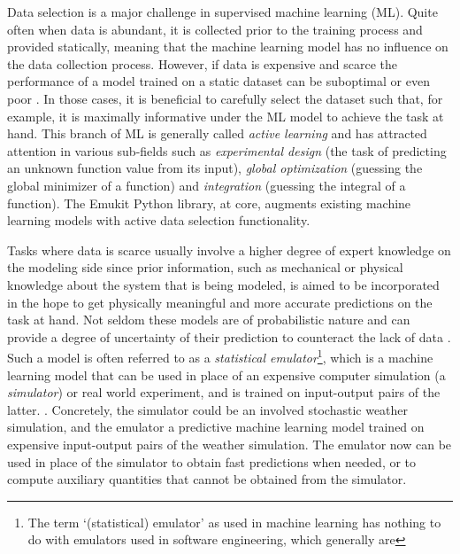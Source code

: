 Data selection is a major challenge in supervised machine learning (ML). Quite often when data is abundant, it is collected prior to the training process and provided statically, meaning that the machine learning model has no influence on the data collection process. However, if data is expensive and scarce the performance of a model trained on a static dataset can be suboptimal or even poor . In those cases, it is beneficial to carefully select the dataset such that, for example, it is maximally informative under the ML model to achieve the task at hand. This branch of ML is generally called \emph{active learning}  and has attracted attention in various sub-fields such as \emph{experimental design} (the task of predicting an unknown function value from its input), \emph{global optimization} (guessing the global minimizer of a function) and \emph{integration} (guessing the integral of a function).
The Emukit Python library, at core, augments existing machine learning models with active data selection functionality.

Tasks where data is scarce usually involve a higher degree of expert knowledge on the modeling side since prior information, such as mechanical or physical knowledge about the system that is being modeled, is aimed to be incorporated in the hope to get physically meaningful and more accurate predictions on the task at hand. Not seldom these models are of probabilistic nature and can provide a degree of uncertainty of their prediction to counteract the lack of data . Such a model is often referred to as a \emph{statistical emulator}\footnote{The term `(statistical) emulator' as used in machine learning has nothing to do with emulators used in software engineering, which generally are }, which is a machine learning model that can be used in place of an expensive computer simulation (a \emph{simulator}) or real world experiment, and is trained on input-output pairs of the latter. . Concretely, the simulator could be an involved stochastic weather simulation, and the emulator a predictive machine learning model trained on expensive input-output pairs of the weather simulation. The emulator now can be used in place of the simulator to obtain fast predictions when needed, or to compute auxiliary quantities that cannot be obtained from the simulator.

